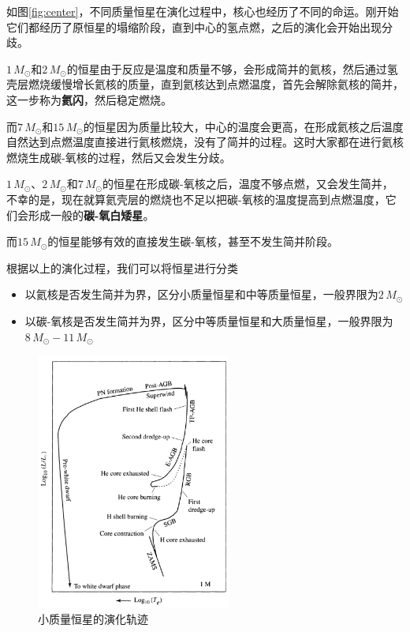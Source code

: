 \documentclass[openany]{ctexbook}
\begin{document}
如图\ref{fig:center}，不同质量恒星在演化过程中，核心也经历了不同的命运。刚开始它们都经历了原恒星的塌缩阶段，直到中心的氢点燃，之后的演化会开始出现分歧。

$1\,M_\odot$和$2\,M_\odot$的恒星由于反应是温度和质量不够，会形成简并的氦核，然后通过氢壳层燃烧缓慢增长氦核的质量，直到氦核达到点燃温度，首先会解除氦核的简并，这一步称为\textbf{氦闪}，然后稳定燃烧。

而$7\,M_\odot$和$15\,M_\odot$的恒星因为质量比较大，中心的温度会更高，在形成氦核之后温度自然达到点燃温度直接进行氦核燃烧，没有了简并的过程。这时大家都在进行氦核燃烧生成碳-氧核的过程，然后又会发生分歧。

$1\,M_\odot$、$2\,M_\odot$和$7\,M_\odot$的恒星在形成碳-氧核之后，温度不够点燃，又会发生简并，不幸的是，现在就算氦壳层的燃烧也不足以把碳-氧核的温度提高到点燃温度，它们会形成一般的\textbf{碳-氧白矮星}。

而$15\,M_\odot$的恒星能够有效的直接发生碳-氧核，甚至不发生简并阶段。

根据以上的演化过程，我们可以将恒星进行分类
\begin{itemize}
  \item 以氦核是否发生简并为界，区分小质量恒星和中等质量恒星，一般界限为$2\,M_\odot$
  \item 以碳-氧核是否发生简并为界，区分中等质量恒星和大质量恒星，一般界限为$8\,M_\odot-11\,M_\odot$
\end{itemize}

\begin{figure}[hbt]
  \centering
  \includegraphics[width=6.4cm]{chapters/13/lowmass}
  \caption{小质量恒星的演化轨迹}
  \label{}
\end{figure}
\end{document}
